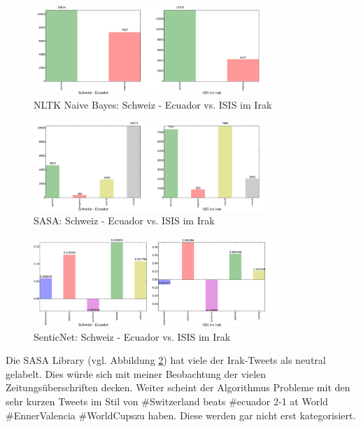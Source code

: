 \begin{figure}[H]
  \centering
  \includegraphics[width=0.8\textwidth]{images/schweizvsirak_nltk.pdf}
  \caption[NLTK Naive Bayes: Schweiz - Ecuador vs. ISIS im Irak]{NLTK Naive Bayes: Schweiz - Ecuador vs. ISIS im Irak}
  \label{fig:naivebayesanalysis}
\end{figure}

\begin{figure}[H]
  \centering
  \includegraphics[width=0.8\textwidth]{images/schweizvsirak_sasa.pdf}
  \caption[SASA: Schweiz - Ecuador vs. ISIS im Irak]{SASA: Schweiz - Ecuador vs. ISIS im Irak}
  \label{fig:sasaanalysis}
\end{figure}

\begin{figure}[H]
  \centering
  \includegraphics[width=0.8\textwidth]{images/schweizvsirak_senticnet.pdf}
  \caption[SenticNet: Schweiz - Ecuador vs. ISIS im Irak]{SenticNet: Schweiz - Ecuador vs. ISIS im Irak}
  \label{fig:senticnetanalysis}
\end{figure}

Die SASA Library (vgl. Abbildung \ref{fig:sasaanalysis}) hat viele der Irak-Tweets als neutral gelabelt. Dies würde sich mit meiner Beobachtung der vielen Zeitungsüberschriften decken. Weiter scheint der Algorithmus Probleme mit den sehr kurzen Tweets im Stil von \flqq \#Switzerland beats \#ecuador 2-1 at World \#EnnerValencia \#WorldCups\frqq zu haben. Diese werden gar nicht erst kategorisiert. 

